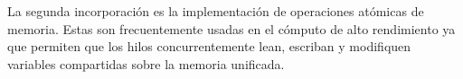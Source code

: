     La segunda incorporación es la implementación de operaciones atómicas de memoria. Estas son frecuentemente usadas en el cómputo de alto rendimiento ya que permiten que los hilos concurrentemente lean, escriban y modifiquen variables compartidas sobre la memoria unificada.
     
     

        
    

